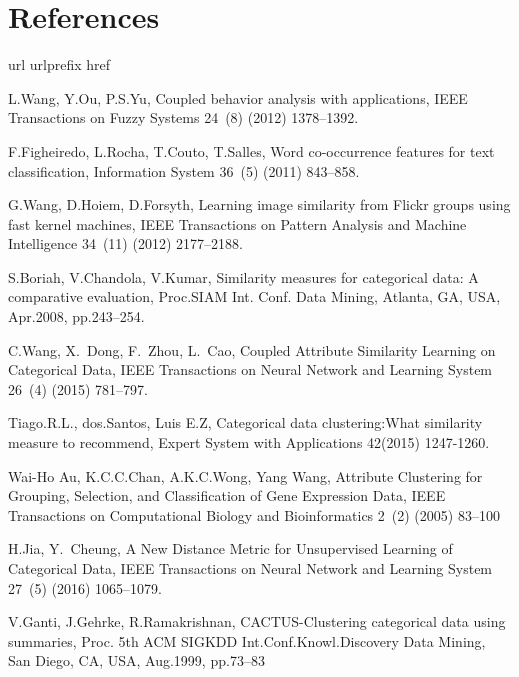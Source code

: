 \documentclass[review]{elsarticle}
\begin{document}
\section*{References}
%
\begin{thebibliography}{10}
\expandafter\ifx\csname url\endcsname\relax
  \def\url#1{\texttt{#1}}\fi
\expandafter\ifx\csname urlprefix\endcsname\relax\def\urlprefix{URL }\fi
\expandafter\ifx\csname href\endcsname\relax
  \def\href#1#2{#2} \def\path#1{#1}\fi

L.Wang, Y.Ou, P.S.Yu, Coupled behavior analysis with applications, IEEE Transactions on Fuzzy Systems 24~(8) (2012) 1378--1392.

F.Figheiredo, L.Rocha, T.Couto, T.Salles, Word co-occurrence features for text classification, Information System 36~(5) (2011) 843--858.

G.Wang, D.Hoiem, D.Forsyth, Learning image similarity from Flickr groups using fast kernel machines, IEEE Transactions on Pattern Analysis and Machine Intelligence 34~(11) (2012) 2177--2188.

S.Boriah, V.Chandola, V.Kumar, Similarity measures for categorical data: A comparative evaluation, Proc.SIAM Int. Conf. Data Mining, Atlanta, GA, USA, Apr.2008, pp.243--254.

C.Wang, X.~Dong, F.~Zhou, L.~Cao, Coupled Attribute Similarity Learning on Categorical Data, IEEE Transactions on Neural Network and Learning System 26~(4) (2015) 781--797.

Tiago.R.L., dos.Santos, Luis E.Z, Categorical data clustering:What similarity measure to recommend, Expert System with Applications 42(2015) 1247-1260.

Wai-Ho Au, K.C.C.Chan, A.K.C.Wong, Yang Wang, Attribute Clustering for Grouping, Selection, and Classification of Gene Expression Data, IEEE Transactions on Computational Biology and Bioinformatics 2~(2) (2005) 83--100

H.Jia, Y.~Cheung, A New Distance Metric for Unsupervised Learning of Categorical Data, IEEE Transactions on Neural Network and Learning System 27~(5) (2016) 1065--1079.

V.Ganti, J.Gehrke, R.Ramakrishnan, CACTUS-Clustering categorical data using summaries, Proc. 5th ACM SIGKDD Int.Conf.Knowl.Discovery Data Mining, San Diego, CA, USA, Aug.1999, pp.73--83


\end{thebibliography}
\end{document}

